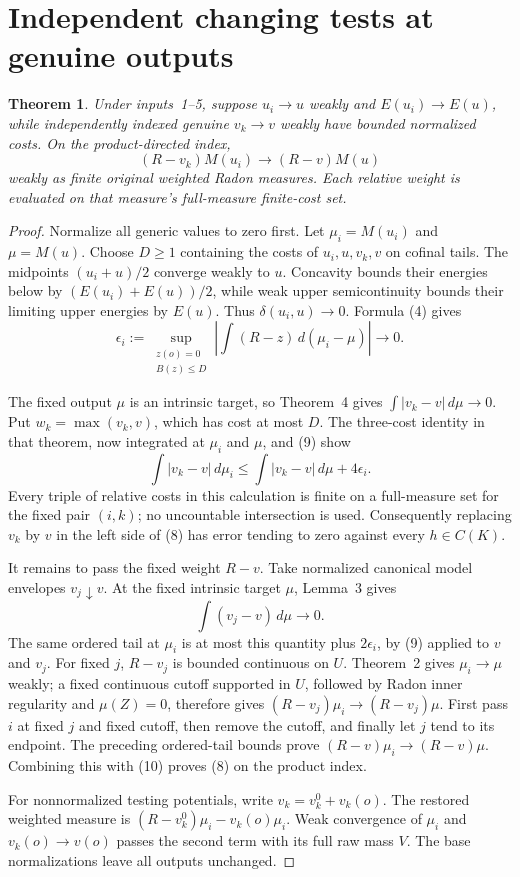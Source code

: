 \documentclass[11pt]{article}
\newtheorem{theorem}{Theorem}
\begin{document}
\section{Independent changing tests at genuine outputs}
\begin{theorem}
Under inputs~1--5, suppose $u_i\to u$ weakly and
$E(u_i)\to E(u)$, while independently indexed genuine
$v_k\to v$ weakly have bounded normalized costs.
On the product-directed index,
\[
             (R-v_k)M(u_i)\longrightarrow(R-v)M(u)       \tag{8}
\]
weakly as finite original weighted Radon measures.
Each relative weight is evaluated on that measure's
full-measure finite-cost set.
\end{theorem}
\begin{proof}
Normalize all generic values to zero first. Let
$\mu_i=M(u_i)$ and $\mu=M(u)$.
Choose $D\geq1$ containing the costs of $u_i,u,v_k,v$
on cofinal tails. The midpoints $(u_i+u)/2$ converge
weakly to $u$. Concavity bounds their energies below by
$(E(u_i)+E(u))/2$, while weak upper semicontinuity
bounds their limiting upper energies by $E(u)$.
Thus $\delta(u_i,u)\to0$. Formula (4) gives
\[
 \epsilon_i:=
 \sup_{\substack{z(o)=0\\B(z)\leq D}}
 \left|\int(R-z)\,d(\mu_i-\mu)\right|\longrightarrow0.
                                                        \tag{9}
\]

The fixed output $\mu$ is an intrinsic target, so
Theorem~4 gives $\int|v_k-v|\,d\mu\to0$.
Put $w_k=\max(v_k,v)$, which has cost at most $D$.
The three-cost identity in that theorem, now integrated
at $\mu_i$ and $\mu$, and (9) show
\[
 \int|v_k-v|\,d\mu_i
       \leq\int|v_k-v|\,d\mu+4\epsilon_i.               \tag{10}
\]
Every triple of relative costs in this calculation is
finite on a full-measure set for the fixed pair $(i,k)$;
no uncountable intersection is used.
Consequently replacing $v_k$ by $v$ in the left side
of (8) has error tending to zero against every $h\in C(K)$.

It remains to pass the fixed weight $R-v$.
Take normalized canonical model envelopes $v_j\downarrow v$.
At the fixed intrinsic target $\mu$, Lemma~3 gives
\[
       \int(v_j-v)\,d\mu\longrightarrow0.
\]
The same ordered tail at $\mu_i$ is at most this quantity
plus $2\epsilon_i$, by (9) applied to $v$ and $v_j$.
For fixed $j$, $R-v_j$ is bounded continuous on $U$.
Theorem~2 gives $\mu_i\to\mu$ weakly; a fixed continuous
cutoff supported in $U$, followed by Radon inner
regularity and $\mu(Z)=0$, therefore gives
$(R-v_j)\mu_i\to(R-v_j)\mu$.
First pass $i$ at fixed $j$ and fixed cutoff, then
remove the cutoff, and finally let $j$ tend to its endpoint.
The preceding ordered-tail bounds prove
$(R-v)\mu_i\to(R-v)\mu$.
Combining this with (10) proves (8) on the product index.

For nonnormalized testing potentials, write
$v_k=v_k^0+v_k(o)$. The restored weighted measure is
$(R-v_k^0)\mu_i-v_k(o)\mu_i$.
Weak convergence of $\mu_i$ and $v_k(o)\to v(o)$
passes the second term with its full raw mass $V$.
The base normalizations leave all outputs unchanged.
\end{proof}
\end{document}
